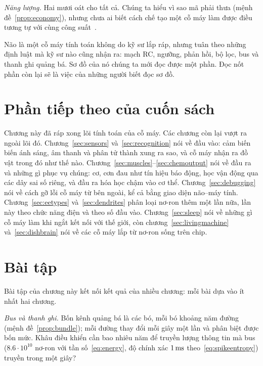 \emph{Năng lượng.} Hai mươi oát cho tất cả. Chúng ta hiểu vì sao mã phải thưa (mệnh đề~\ref{prop:economy}), nhưng chưa ai biết cách chế tạo một cỗ máy làm được điều tương tự với cùng công suất~\cite{MehonicKenyon2022}.

Não là một cỗ máy tính toán không do kỹ sư lắp ráp, nhưng tuân theo những định luật mà kỹ sư nào cũng nhận ra: mạch RC, ngưỡng, phản hồi, bộ lọc, bus và thanh ghi quảng bá. Sơ đồ của nó chúng ta mới đọc được một phần. Đọc nốt phần còn lại sẽ là việc của những người biết đọc sơ đồ.

\section{Phần tiếp theo của cuốn sách}

Chương này đã ráp xong lõi tính toán của cỗ máy. Các chương còn lại vượt ra ngoài lõi đó. Chương~\ref{sec:sensors} và~\ref{sec:recognition} nói về đầu vào: cảm biến biến ánh sáng, âm thanh và phân tử thành xung ra sao, và cỗ máy nhận ra đồ vật trong đó như thế nào. Chương~\ref{sec:muscles}--\ref{sec:chemoutput} nói về đầu ra và những gì phục vụ chúng: cơ, cơn đau như tín hiệu báo động, học vận động qua các dây sai số riêng, và đầu ra hóa học chậm vào cơ thể. Chương~\ref{sec:debugging} nói về cách gỡ lỗi cỗ máy từ bên ngoài, kể cả bằng giao diện não--máy tính. Chương~\ref{sec:eetypes} và~\ref{sec:dendrites} phân loại nơ-ron thêm một lần nữa, lần này theo chức năng điện và theo số đầu vào. Chương~\ref{sec:sleep} nói về những gì cỗ máy làm khi ngắt kết nối với thế giới, còn chương~\ref{sec:livingmachine} và~\ref{sec:dishbrain} nói về các cỗ máy lắp từ nơ-ron sống trên chip.

\section{Bài tập}

Bài tập của chương này kết nối kết quả của nhiều chương: mỗi bài dựa vào ít nhất hai chương.

\begin{exercise}[\lvlA]
\label{ex:10:1}
\emph{Bus và thanh ghi.} Bốn kênh quảng bá là các bó, mỗi bó khoảng năm đường (mệnh đề~\ref{prop:bundle}); mỗi đường thay đổi mỗi giây một lần và phân biệt được bốn mức. Khâu điều khiển cần bao nhiêu năm để truyền lượng thông tin mà bus  ($8.6\cdot10^{10}$ nơ-ron với tần số~\eqref{eq:energy}, độ chính xác $1\,\text{ms}$ theo~\eqref{eq:spikeentropy}) truyền trong một giây?
\end{exercise}

